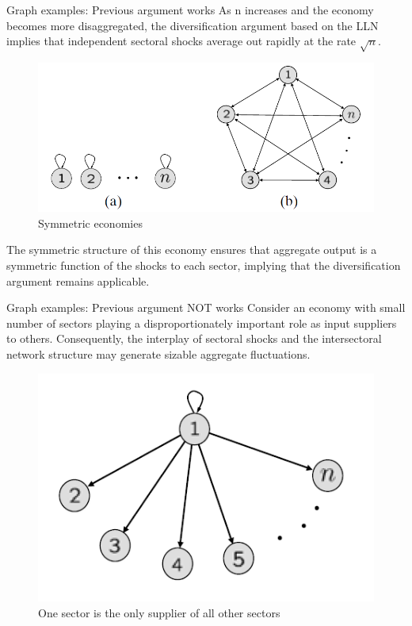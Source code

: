 \documentclass{beamer}
\begin{document}
\begin{frame}{Graph examples: Previous argument works}
    \justifying
   As n increases and the economy becomes more disaggregated,
    the diversification argument based on the LLN
    implies that independent sectoral shocks average out rapidly at the rate
    $\sqrt{n}$.
    
    \begin{figure}[H]
      \caption*{Symmetric economies}
      \includegraphics[scale=0.7]{1}
      \centering
    \end{figure}

The symmetric
structure of this economy ensures that aggregate output is a symmetric
function of the shocks to each sector, implying that the diversification argument
remains applicable.

\end{frame}
\begin{frame}{Graph examples: Previous argument NOT works}
    \justifying
    Consider  an economy with small number of sectors playing a disproportionately
    important role as input suppliers to others. Consequently, the
    interplay of sectoral shocks and the intersectoral network structure may generate
    sizable aggregate fluctuations.
    
    \begin{figure}[H]
      \caption*{One sector is the only supplier of all other sectors}
      \includegraphics[scale=0.7]{2}
      \centering
    \end{figure}
\end{frame}
\end{document}
